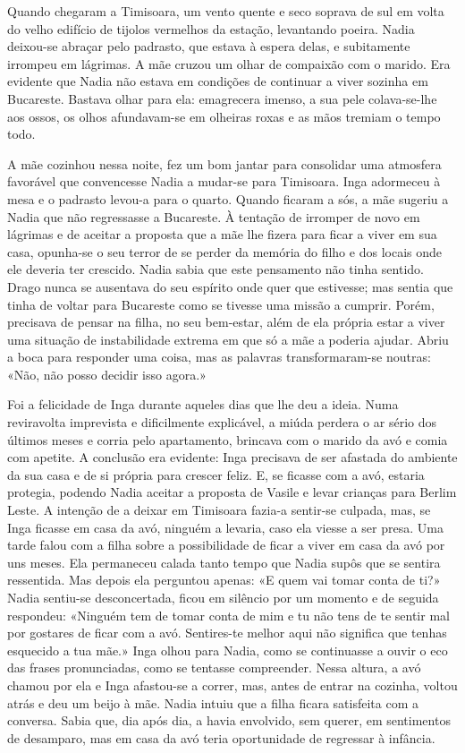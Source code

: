Quando chegaram a Timisoara, um vento quente e seco soprava de sul em
volta do velho edifício de tijolos vermelhos da estação, levantando
poeira. Nadia deixou-se abraçar pelo padrasto, que estava à espera
delas, e subitamente irrompeu em lágrimas. A mãe cruzou um olhar de compaixão com o marido. Era evidente que Nadia não estava em condições de
continuar a viver sozinha em Bucareste. Bastava olhar para ela:
emagrecera imenso, a sua pele colava-se-lhe aos ossos, os olhos
afundavam-se em olheiras roxas e as mãos tremiam o tempo todo.

A mãe cozinhou nessa noite, fez um bom jantar para consolidar uma
atmosfera favorável que convencesse Nadia a mudar-se para Timisoara.
Inga adormeceu à mesa e o padrasto levou-a para o quarto. Quando ficaram
a sós, a mãe sugeriu a Nadia que não regressasse a Bucareste. À tentação de irromper de novo em lágrimas e de aceitar a proposta que a
mãe lhe fizera para ficar a viver em sua casa, opunha-se o seu terror de
se perder da memória do filho e dos locais onde ele deveria ter
crescido. Nadia sabia que este pensamento não tinha sentido. Drago nunca
se ausentava do seu espírito onde quer que estivesse; mas sentia que
tinha de voltar para Bucareste como se tivesse uma missão a cumprir.
Porém, precisava de pensar na filha, no seu bem-estar, além de ela
própria estar a viver uma situação de instabilidade extrema em que só a
mãe a poderia ajudar. Abriu a boca para responder uma coisa, mas as
palavras transformaram-se noutras: «Não, não posso decidir isso
agora.»

Foi a felicidade de Inga durante aqueles dias que lhe deu a ideia. Numa
reviravolta imprevista e dificilmente explicável, a miúda perdera o ar
sério dos últimos meses e corria pelo apartamento, brincava com o marido
da avó e comia com apetite. A conclusão era evidente: Inga precisava
de ser afastada do ambiente da sua casa e de si própria para crescer
feliz. E, se ficasse com a avó, estaria protegia, podendo Nadia aceitar
a proposta de Vasile e levar crianças para Berlim Leste. A intenção de a
deixar em Timisoara fazia-a sentir-se culpada, mas, se Inga ficasse em
casa da avó, ninguém a levaria, caso ela viesse a ser presa. Uma tarde
falou com a filha sobre a possibilidade de ficar a viver em casa da avó
por uns meses. Ela permaneceu calada tanto tempo que Nadia supôs que se
sentira ressentida. Mas depois ela perguntou apenas: «E quem vai tomar
conta de ti?» Nadia sentiu-se desconcertada, ficou em silêncio por um
momento e de seguida respondeu: «Ninguém tem de tomar conta de mim e
tu não tens de te sentir mal por gostares de ficar com a avó.
Sentires-te melhor aqui não significa que tenhas esquecido a tua mãe.»
Inga olhou para Nadia, como se continuasse a ouvir o eco das frases
pronunciadas, como se tentasse compreender. Nessa altura, a avó chamou
por ela e Inga afastou-se a correr, mas, antes de entrar na cozinha,
voltou atrás e deu um beijo à mãe. Nadia intuiu que a filha ficara
satisfeita com a conversa. Sabia que, dia após dia, a havia envolvido,
sem querer, em sentimentos de desamparo, mas em casa da avó
teria oportunidade de regressar à infância.

